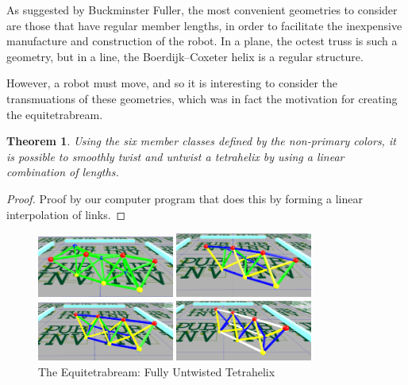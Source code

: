 \documentclass[11pt]{article}
\newtheorem{theorem}{Theorem}
\begin{document}
As suggested by Buckminster Fuller, the most convenient geometries to consider are those that have regular member
lengths, in order to facilitate the inexpensive manufacture and construction of the robot.  In a plane, the octest truss
is such a geometry, but in a line, the Boerdijk--Coxeter helix is a regular structure.

However, a robot must move, and so it is interesting to consider the transmuations of these geometries, which was in
fact the motivation for creating the equitetrabream.

\begin{theorem}

  Using the six member classes defined by the non-primary colors, it is possible to smoothly twist and untwist a tetrahelix by
  using a linear combination of lengths.
  
\end{theorem}

\begin{proof}
  Proof by our computer program that does this by forming a linear interpolation of links.
\end{proof}

\begin{figure}[H] %
  \centering
     \includegraphics[width=0.4\textwidth]{figures/Tetrahelix0.png}
     \caption{Regular Tetrahelix}
     \includegraphics[width=0.4\textwidth]{figures/Tetrahelix1.png}
     \caption{2/3rd Twisted Tetrahelix}
     \includegraphics[width=0.4\textwidth]{figures/Tetrahelix2.png}
     \caption{1/3rd Twisted, 2/3rd Untwisted Tetrahelix}
     \includegraphics[width=0.4\textwidth]{figures/Tetrahelix3.png}
     \caption{The Equitetrabream: Fully Untwisted Tetrahelix}
\end{figure}
\end{document}

